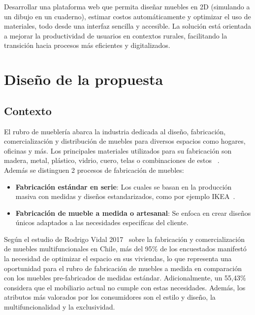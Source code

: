﻿\documentclass{iccmemoria}
\begin{document}
\noindent Desarrollar una plataforma web que permita diseñar muebles en 2D (simulando a un dibujo en un cuaderno), estimar costos automáticamente y optimizar el uso de materiales, todo desde una interfaz sencilla y accesible. La solución está orientada a mejorar la productividad de usuarios en contextos rurales, facilitando la transición hacia procesos más eficientes y digitalizados.

\endgroup

\section{Diseño de la propuesta}
\subsection{Contexto}
\onehalfspacing
\begingroup
El rubro de mueblería abarca la industria dedicada al diseño, fabricación, comercialización y distribución de muebles para diversos espacios como hogares, oficinas y más. Los principales materiales utilizados para su fabricación son madera, metal, plástico, vidrio, cuero, telas o combinaciones de estos ~\cite{manufacturera}.\\

\noindent Además se distinguen 2 procesos de fabricación de muebles:
\begin{itemize}
    \item \textbf{Fabricación estándar en serie}: Los cuales se basan en la producción masiva con medidas y diseños estandarizados, como por ejemplo IKEA~\cite{IKEA}.

    \item  \textbf{Fabricación de mueble a medida o artesanal}: Se enfoca en crear diseños únicos adaptados a las necesidades especifícas del cliente.~\cite{uchile_fabricacion}
\end{itemize}

\noindent Según el estudio de Rodrigo Vidal 2017~\cite{uchile_fabricacion} sobre la fabricación y comercialización de muebles multifuncionales en Chile, más del 95\% de los encuestados manifestó la necesidad de optimizar el espacio en sus viviendas, lo que representa una oportunidad para el rubro de fabricación de muebles a medida en comparación con los muebles pre-fabricados de medidas estándar. Adicionalmente, un 55,43\% considera que el mobiliario actual no cumple con estas necesidades. Además, los atributos más valorados por los consumidores son el estilo y diseño, la multifuncionalidad y la exclusividad.\\
\end{document}

